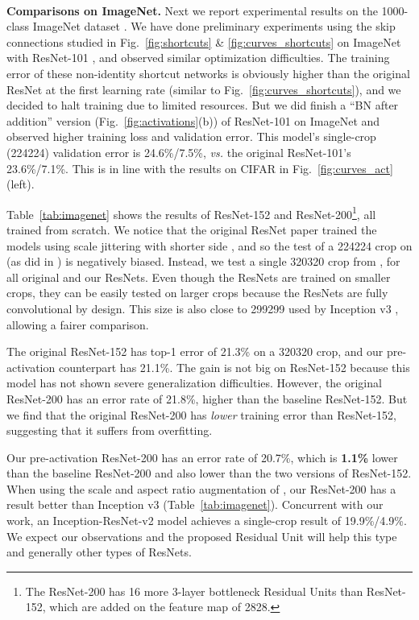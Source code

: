 \documentclass[runningheads]{llncs}
\def\vs{\emph{vs. }}
\begin{document}
{\small ~\\}
\noindent\textbf{Comparisons on ImageNet.}
Next we report experimental results on the 1000-class ImageNet dataset \cite{Russakovsky2015}. We have done preliminary experiments using the skip connections studied in Fig.~\ref{fig:shortcuts} \& \ref{fig:curves_shortcuts}  on ImageNet with ResNet-101 \cite{He2016}, and observed similar optimization difficulties. The training error of these non-identity shortcut networks is obviously higher than the original ResNet at the first learning rate (similar to Fig.~\ref{fig:curves_shortcuts}), and we decided to halt training due to limited resources. But we did finish a ``BN after addition'' version (Fig.~\ref{fig:activations}(b)) of ResNet-101 on ImageNet and observed higher training loss and validation error. This model's single-crop (224224) validation error is 24.6\%/7.5\%, \vs the original ResNet-101's 23.6\%/7.1\%. This is in line with the results on CIFAR in Fig.~\ref{fig:curves_act} (left).

Table~\ref{tab:imagenet} shows the results of ResNet-152 \cite{He2016} and ResNet-200\footnote{The ResNet-200 has 16 more 3-layer bottleneck Residual Units than ResNet-152, which are added on the feature map of 2828.}, all trained from scratch. We notice that the original ResNet paper \cite{He2016} trained the models using scale jittering with shorter side , and so the test of a 224224 crop on  (as did in \cite{He2016}) is negatively biased. Instead, we test a single 320320 crop from , for all original and our ResNets.
Even though the ResNets are trained on smaller crops, they can be easily tested on larger crops because the ResNets are fully convolutional by design. This size is also close to 299299 used by Inception v3 \cite{Szegedy2016a}, allowing a fairer comparison.

The original ResNet-152 \cite{He2016} has top-1 error of 21.3\% on a 320320 crop, and our pre-activation counterpart has 21.1\%. The gain is not big on ResNet-152 because this model has not shown severe generalization difficulties. However, the original ResNet-200 has an error rate of 21.8\%, higher than the baseline ResNet-152.
But we find that the original ResNet-200 has \emph{lower} training error than ResNet-152, suggesting that it suffers from overfitting.

Our pre-activation ResNet-200 has an error rate of 20.7\%, which is \textbf{1.1\%} lower than the baseline ResNet-200 and also lower than the two versions of ResNet-152. When using the scale and aspect ratio augmentation of \cite{Szegedy2015,Szegedy2016a}, our ResNet-200 has a result better than Inception v3 \cite{Szegedy2016a} (Table~\ref{tab:imagenet}). Concurrent with our work, an Inception-ResNet-v2 model \cite{Szegedy2016} achieves a single-crop result of 19.9\%/4.9\%. We expect our observations and the proposed Residual Unit will help this type and generally other types of ResNets.
\end{document}
